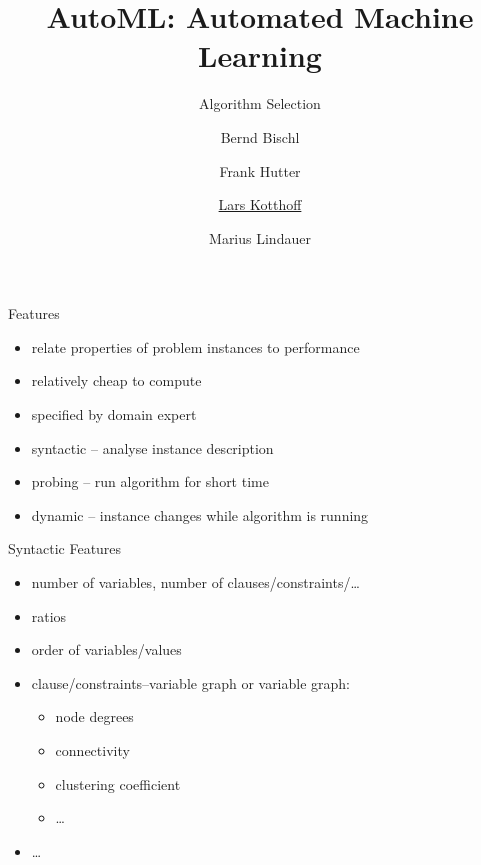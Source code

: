 




\title[AutoML: Overview]{AutoML: Automated Machine Learning}
\subtitle{Algorithm Selection}
\author[Lars Kotthoff]{Bernd Bischl \and Frank Hutter \and \underline{Lars Kotthoff} \and Marius Lindauer}
\institute{}
\date{}





	
	\maketitle
	

\begin{frame}{Features}
\begin{itemize}
\item relate properties of problem instances to performance
\item relatively cheap to compute
\item specified by domain expert
\item syntactic -- analyse instance description
\item probing -- run algorithm for short time
\item dynamic -- instance changes while algorithm is running
\end{itemize}
\end{frame}

\begin{frame}{Syntactic Features}
\begin{itemize}
\item number of variables, number of clauses/constraints/\ldots
\item ratios
\item order of variables/values
\item clause/constraints--variable graph or variable graph:
    \begin{itemize}
    \item node degrees
    \item connectivity
    \item clustering coefficient
    \item \ldots
    \end{itemize}
\item \ldots
\end{itemize}
\end{frame}

